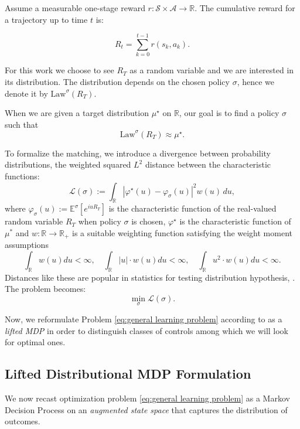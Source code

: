 \documentclass[reqno, 11pt]{amsart}%
\newcommand\cA{\mathcal A}
\newcommand\cS{\mathcal S}
\newcommand\RR{\mathbb R}
\theoremstyle{definition}
\begin{document}
Assume a measurable one-stage reward $r:\cS \times \cA \to \RR$. The cumulative reward for a trajectory up to time $t$ is:   

\begin{equation}
    R_t = \sum_{k=0}^{t-1} r(s_k, a_k). 
\end{equation}

For this work we choose to see $R_T$ as a random variable and we are interested in its distribution. The distribution depends on the chosen policy $\sigma$, hence we denote it by $\text{Law}^\sigma(R_T)$. 

When we are given a target distribution $\mu^\star$ on $\RR$, our goal is to find a policy $\sigma$  such that 
\begin{equation}
\label{eq:matching equation}
    \text{Law}^\sigma(R_T) \approx \mu^\star.
\end{equation}

To formalize the matching, we introduce a divergence between probability distributions, the weighted squared $L^2$ distance between the characteristic functions:
\begin{equation}
\label{eq:def: general Loss} 
    \mathcal{L}(\sigma) := \int_{\mathbb{R}} \left| \varphi^\star(u) - \varphi_{\sigma}(u) \right|^2 w(u) \, du,
\end{equation}
where $\varphi_{\sigma}(u) := \mathbb{E}^\sigma[e^{iu R_T}]$ is the characteristic function of the real-valued random variable $R_T$ when policy $\sigma$ is chosen, $\varphi^\star$ is the characteristic function of $\mu^*$ and $w: \mathbb{R} \to \mathbb{R}_+$ is a suitable weighting function satisfying the weight moment assumptions 
\begin{equation*}
  \int_\RR  w(u) du < \infty, \quad   \int_\RR |u| \cdot w(u) du < \infty, \quad  \int_\RR u^2 \cdot w(u) du < \infty.
\end{equation*}
Distances like these are popular in statistics for testing distribution hypothesis, \cite{epps1983test,baringhaus1988consistent}.
The problem becomes:
\begin{equation}
\label{eq:general learning problem}
    \min_{\sigma} \mathcal{L}(\sigma).
\end{equation}

Now, we reformulate Problem \eqref{eq:general learning problem} according to \cite{bauerle2025distributionalbellmanequation} as a \emph{lifted MDP} in order to distinguish classes of controls among which we will look for optimal ones. 

 \subsection{Lifted Distributional MDP Formulation} \label{sec:liftedMDP}
 We now recast optimization problem \eqref{eq:general learning problem} as a Markov Decision Process on an \emph{augmented state space} that captures the distribution of outcomes. 
\end{document}
